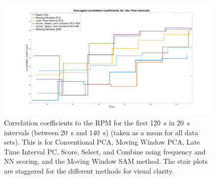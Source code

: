             \begin{figure}
                \centering
                
                \includegraphics[width=1.0\linewidth]{figures/data_driven_surrogate_signal_extraction_methods_1_all_correlation_coefficient.png}
                
                \captionsetup{singlelinecheck=false}
                \caption{
                    Correlation coefficients to the \gls{RPM} for the first \SI{120}{\second} in \SI{20}{\second} intervals (between \SI{20}{\second} and \SI{140}{\second}) (taken as a mean for all data sets). This is for Conventional \gls{PCA}, Moving Window \gls{PCA}, Late Time Interval \gls{PC}, Score, Select, and Combine using frequency and \gls{NN} scoring, and the Moving Window \gls{SAM} method. The stair plots are staggered for the different methods for visual clarity.
                }
                \label{fig:all_cross_correlation}
            \end{figure}
            
